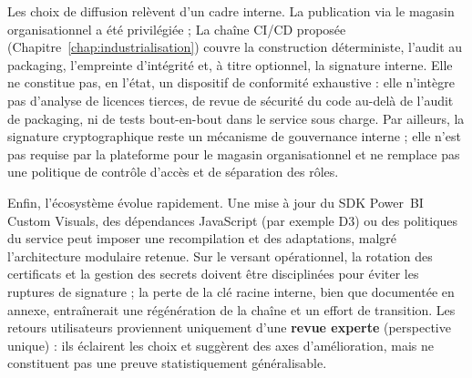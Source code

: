 Les choix de diffusion relèvent d’un cadre interne. 
La publication via le magasin organisationnel a été privilégiée ; 
La chaîne CI/CD proposée (Chapitre~\ref{chap:industrialisation}) couvre la construction déterministe, l’audit au packaging, l’empreinte d’intégrité et, à titre optionnel, la signature interne. 
Elle ne constitue pas, en l’état, un dispositif de conformité exhaustive : 
elle n’intègre pas d’analyse de licences tierces, de revue de sécurité du code au-delà de l’audit de packaging, ni de tests bout-en-bout dans le service sous charge. 
Par ailleurs, la signature cryptographique reste un mécanisme de gouvernance interne ; 
elle n’est pas requise par la plateforme pour le magasin organisationnel et ne remplace pas une politique de contrôle d’accès et de séparation des rôles.

Enfin, l’écosystème évolue rapidement. 
Une mise à jour du SDK Power~BI Custom Visuals, des dépendances JavaScript (par exemple D3) ou des politiques du service peut imposer une recompilation et des adaptations, 
malgré l’architecture modulaire retenue. 
Sur le versant opérationnel, la rotation des certificats et la gestion des secrets doivent être disciplinées pour éviter les ruptures de signature ; 
la perte de la clé racine interne, bien que documentée en annexe, entraînerait une régénération de la chaîne et un effort de transition. 
Les retours utilisateurs proviennent uniquement d’une \textbf{revue experte} (perspective unique) : 
ils éclairent les choix et suggèrent des axes d’amélioration, 
mais ne constituent pas une preuve statistiquement généralisable.
